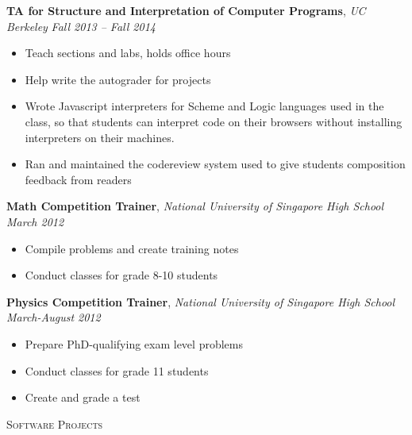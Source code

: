 \documentclass[9pt]{article}
\newenvironment{changemargin}[2]{%
  \begin{list}{}{%
      \setlength{\topsep}{0pt}%
      \setlength{\leftmargin}{#1}%
      \setlength{\rightmargin}{#2}%
      \setlength{\listparindent}{\parindent}%
      \setlength{\itemindent}{\parindent}%
      \setlength{\parsep}{\parskip}%
    }%
  \item[]}{\end{list}
}
\newcommand{\lineover}{
  \begin{changemargin}{-0.05in}{-0.05in}
    \vspace*{-8pt}
    \hrulefill \\
    \vspace*{-2pt}
  \end{changemargin}
}
\newcommand{\header}[1]{
  \begin{changemargin}{-0.5in}{-0.5in}
    \scshape{#1}\\
    \lineover
  \end{changemargin}
}
\newenvironment{body} {
  \vspace*{-16pt}
  \begin{changemargin}{-0.25in}{-0.5in}
  }
  {\end{changemargin}
}
\begin{document}
\begin{body}
  \textbf{TA for Structure and Interpretation of Computer Programs}, \emph{UC Berkeley} \hfill \emph{Fall 2013 -- Fall 2014}\\
  \vspace*{-4pt}
  \begin{itemize} \itemsep -0pt  %
  \item Teach sections and labs, holds office hours
  \item Help write the autograder for projects
  \item Wrote Javascript interpreters for Scheme and Logic languages used in the
    class, so that students can interpret code on their browsers without
    installing interpreters on their machines.
  \item Ran and maintained the codereview system used to give students
    composition feedback from readers
  \end{itemize}

  \textbf{Math Competition Trainer}, \emph{National University of Singapore High School} \hfill \emph{March 2012}\\
  \vspace*{-4pt}
  \begin{itemize} \itemsep -0pt  %
  \item Compile problems and create training notes
  \item Conduct classes for grade 8-10 students
  \end{itemize}

  \textbf{Physics Competition Trainer}, \emph{National University of Singapore High School} \hfill \emph{March-August 2012}\\
  \vspace*{-4pt}
  \begin{itemize} \itemsep -0pt  %
  \item Prepare PhD-qualifying exam level problems
  \item Conduct classes for grade 11 students
  \item Create and grade a test
  \end{itemize}
\end{body}

\header{Software Projects}
\end{document}
